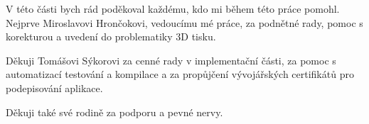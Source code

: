 V této části bych rád poděkoval každému, kdo mi během této práce pomohl.
Nejprve Miroslavovi Hrončokovi, vedoucímu mé práce, za podnětné rady, pomoc s korekturou a uvedení do problematiky 3D tisku.

Děkuji Tomášovi Sýkorovi za cenné rady v implementační části, za pomoc s automatizací testování a kompilace a za propůjčení vývojářských certifikátů pro podepisování aplikace.

Děkuji také své rodině za podporu a pevné nervy.
